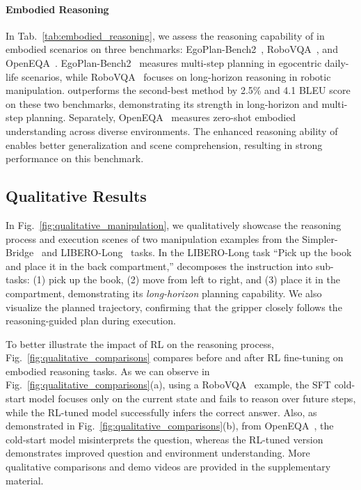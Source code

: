 \paragraph{Embodied Reasoning}

In Tab.~\ref{tab:embodied_reasoning}, we assess the reasoning capability of \ours{} in embodied scenarios on three benchmarks: EgoPlan-Bench2~\cite{qiu2024egoplan}, RoboVQA~\cite{sermanet2024robovqa}, and OpenEQA~\cite{majumdar2023openeqa}. EgoPlan-Bench2~\cite{qiu2024egoplan} measures multi-step planning in egocentric daily-life scenarios, while RoboVQA~\cite{sermanet2024robovqa} focuses on long-horizon reasoning in robotic manipulation. \ours{} outperforms the second-best method by 2.5\% and 4.1 BLEU score on these two benchmarks, demonstrating its strength in long-horizon and multi-step planning. Separately, OpenEQA~\cite{majumdar2023openeqa} measures zero-shot embodied understanding across diverse environments. The enhanced reasoning ability of \ours{} enables better generalization and scene comprehension, resulting in strong performance on this benchmark.









\subsection{Qualitative Results}


In Fig.~\ref{fig:qualitative_manipulation}, we qualitatively showcase the reasoning process and execution scenes of two manipulation examples from the Simpler-Bridge~\cite{li24simpler} and LIBERO-Long~\cite{liu2023libero} tasks. In the LIBERO-Long task “Pick up the book and place it in the back compartment,” \ours{} decomposes the instruction into sub-tasks: (1) pick up the book, (2) move from left to right, and (3) place it in the compartment, demonstrating its \emph{long-horizon} planning capability. We also visualize the planned trajectory, confirming that the gripper closely follows the reasoning-guided plan during execution.

To better illustrate the impact of RL on the reasoning process, Fig.~\ref{fig:qualitative_comparisons} compares \ours{} before and after RL fine-tuning on embodied reasoning tasks. As we can observe in Fig.~\ref{fig:qualitative_comparisons}(a), using a RoboVQA~\cite{sermanet2024robovqa} example, the SFT cold-start model focuses only on the current state and fails to reason over future steps, while the RL-tuned model successfully infers the correct answer. Also, as demonstrated in Fig.~\ref{fig:qualitative_comparisons}(b), from OpenEQA~\cite{majumdar2023openeqa}, the cold-start model misinterprets the question, whereas the RL-tuned version demonstrates improved question and environment understanding. More qualitative comparisons and demo videos are provided in the supplementary material.


